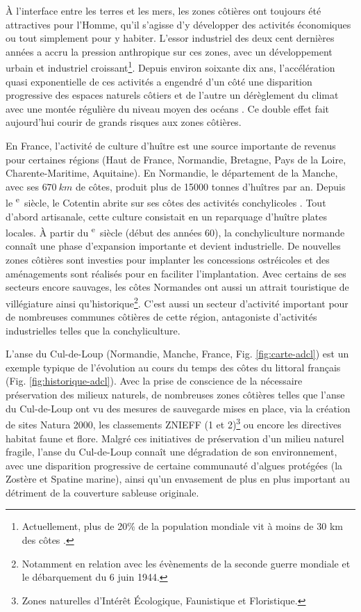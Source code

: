 \documentclass[10pt,a4paper,titlepage]{article}
\def\siecle#1{\textsc{\romannumeral #1}\textsuperscript{e}~siècle}
\begin{document}
    À l'interface entre les terres et les mers, les zones côtières ont toujours été attractives pour l'Homme, qu'il s'agisse d'y développer des activités économiques ou tout simplement pour y habiter.
    L’essor industriel des deux cent dernières années a accru la pression anthropique sur ces zones, avec un développement urbain et industriel croissant\footnote{Actuellement, plus de 20\% de la population mondiale vit à moins de 30 km des côtes \parencite{senat2015}.}.
    Depuis environ soixante dix ans, l'accélération quasi exponentielle de ces activités a engendré d'un côté une disparition progressive des espaces naturels côtiers et de l'autre un dérèglement du climat avec une montée régulière du niveau moyen des océans \parencite{ipcc2021}. Ce double effet fait aujourd'hui courir de grands risques aux zones côtières.

    En France, l'activité de culture d'huître est une source importante de revenus pour certaines régions (Haut de France, Normandie, Bretagne, Pays de la Loire, Charente-Maritime, Aquitaine). En Normandie, le département de la Manche, avec ses $670~km$ de côtes, produit plus de \num{15000} tonnes d'huîtres par an. Depuis le \siecle{18}, le Cotentin abrite sur ses côtes des activités conchylicoles \parencite{Kopp2000}. Tout d'abord artisanale, cette culture consistait en un reparquage d'huître plates locales. À partir du \siecle{20} (début des années 60), la conchyliculture normande connaît une phase d'expansion importante et devient industrielle. De nouvelles zones côtières sont investies pour implanter les concessions ostréicoles et des aménagements sont réalisés pour en faciliter l'implantation.
    Avec certains de ses secteurs encore sauvages, les côtes Normandes ont aussi un attrait touristique de villégiature ainsi qu'historique\footnote{Notamment en relation avec les évènements de la seconde guerre mondiale et le débarquement du 6 juin 1944.}.  C'est aussi un secteur d'activité important pour de nombreuses communes côtières de cette région, antagoniste d'activités industrielles telles que la conchyliculture.

    L'anse du Cul-de-Loup (Normandie, Manche, France, Fig. \ref{fig:carte-adcl}) est un exemple typique de l'évolution au cours du temps des côtes du littoral français (Fig. \ref{fig:historique-adcl}). Avec la prise de conscience de la nécessaire préservation des milieux naturels, de nombreuses zones côtières telles que l'anse du Cul-de-Loup ont vu des mesures de sauvegarde mises en place, via la création de sites Natura 2000, les classements ZNIEFF (1 et 2)\footnote{Zones naturelles d’Intérêt Écologique, Faunistique et Floristique.}  ou encore les directives habitat faune et flore. Malgré ces initiatives de préservation d'un milieu naturel fragile, l'anse du Cul-de-Loup connaît une dégradation de son environnement, avec une disparition progressive de certaine communauté d'algues protégées (la Zostère et Spatine marine), ainsi qu'un envasement de plus en plus important au détriment de la couverture sableuse originale.
\end{document}
